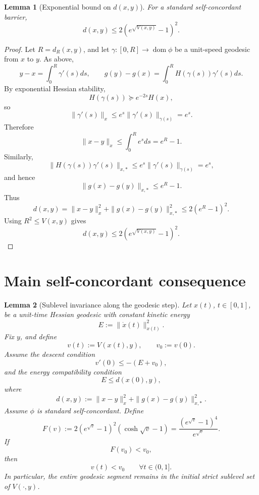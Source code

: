 \documentclass[11pt]{article}
\newtheorem{lemma}{Lemma}
\begin{document}
\begin{lemma}[Exponential bound on $d(x,y)$]
For a standard self-concordant barrier,
\[
    d(x,y)
    \le
    2\left(e^{\sqrt{V(x,y)}}-1\right)^2.
\]
\end{lemma}

\begin{proof}
Let $R=d_R(x,y)$, and let $\gamma:[0,R]\to\operatorname{dom}\phi$ be a unit-speed geodesic from $x$ to $y$. As above,
\[
    y-x=\int_0^R \gamma'(s)ds,
    \qquad
    g(y)-g(x)=\int_0^R H(\gamma(s))\gamma'(s)ds.
\]
By exponential Hessian stability,
\[
    H(\gamma(s))\succeq e^{-2s}H(x),
\]
so
\[
    \|\gamma'(s)\|_x
    \le
    e^s\|\gamma'(s)\|_{\gamma(s)}=e^s.
\]
Therefore
\[
    \|x-y\|_x
    \le
    \int_0^R e^sds
    =e^R-1.
\]
Similarly,
\[
    \|H(\gamma(s))\gamma'(s)\|_{x,*}
    \le
    e^s\|\gamma'(s)\|_{\gamma(s)}=e^s,
\]
and hence
\[
    \|g(x)-g(y)\|_{x,*}
    \le
    e^R-1.
\]
Thus
\[
    d(x,y)
    =
    \|x-y\|_x^2+
    \|g(x)-g(y)\|_{x,*}^2
    \le
    2(e^R-1)^2.
\]
Using $R^2\le V(x,y)$ gives
\[
    d(x,y)
    \le
    2\left(e^{\sqrt{V(x,y)}}-1\right)^2.
\]
\end{proof}

\section{Main self-concordant consequence}


\begin{lemma}[Sublevel invariance along the geodesic step]
Let \(x(t)\), \(t\in[0,1]\), be a unit-time Hessian geodesic with constant
kinetic energy
\[
    E:=\|\dot x(t)\|_{x(t)}^2 .
\]
Fix \(y\), and define
\[
    v(t):=V(x(t),y),
    \qquad
    v_0:=v(0).
\]
Assume the descent condition
\[
    v'(0)\le -(E+v_0),
\]
and the energy compatibility condition
\[
    E\le d(x(0),y),
\]
where
\[
    d(x,y):=\|x-y\|_x^2+\|g(x)-g(y)\|_{x,*}^2.
\]
Assume \(\phi\) is standard self-concordant. Define
\[
    F(v)
    :=
    2(e^{\sqrt v}-1)^2(\cosh\sqrt v-1)
    =
    \frac{(e^{\sqrt v}-1)^4}{e^{\sqrt v}}.
\]
If
\[
    F(v_0)<v_0,
\]
then
\[
    v(t)<v_0
    \qquad
    \forall t\in(0,1].
\]
In particular, the entire geodesic segment remains in the initial strict
sublevel set of \(V(\cdot,y)\).
\end{lemma}
\end{document}
